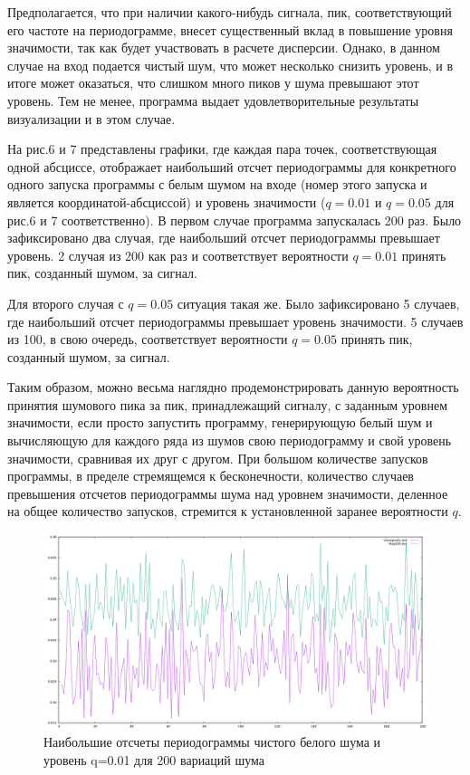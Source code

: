 \documentclass[12pt]{article}
\begin{document}
	 Предполагается, что при наличии какого-нибудь сигнала, пик, соответствующий его частоте на периодограмме, внесет существенный вклад в повышение уровня значимости, так как будет участвовать в расчете дисперсии. Однако, в данном случае на вход подается чистый шум, что может несколько снизить уровень, и в итоге может оказаться, что слишком много пиков у шума превышают этот уровень. Тем не менее, программа выдает удовлетворительные результаты визуализации и в этом случае. 
	 
	 На рис.6 и 7 представлены графики, где каждая пара точек, соответствующая одной абсциссе, отображает наибольший отсчет периодограммы для конкретного одного запуска программы с белым шумом на входе (номер этого запуска и является координатой-абсциссой) и уровень значимости ($q=0.01$ и $q=0.05$ для рис.6 и 7 соответственно). В первом случае программа запускалась 200 раз. Было зафиксировано два случая, где наибольший отсчет периодограммы превышает уровень. 2 случая из 200 как раз и соответствует вероятности $q=0.01$ принять пик, созданный шумом, за сигнал. 
	 
	 Для второго случая с $q=0.05$ ситуация такая же. Было зафиксировано 5 случаев, где наибольший отсчет периодограммы превышает уровень значимости. 5 случаев из 100, в свою очередь, соответствует вероятности $q=0.05$ принять пик, созданный шумом, за сигнал.
	 
	 Таким образом, можно весьма наглядно продемонстрировать данную вероятность принятия шумового пика за пик, принадлежащий сигналу, с заданным уровнем значимости, если просто запустить программу, генерирующую белый шум и вычисляющую для каждого ряда из шумов свою периодограмму и свой уровень значимости, сравнивая их друг с другом. При большом количестве запусков программы, в пределе стремящемся к бесконечности, количество случаев превышения отсчетов периодограммы шума над уровнем значимости, деленное на общее количество запусков, стремится к установленной заранее вероятности $q$.

		\begin{figure}[h]
			\centering
			\includegraphics[width=14cm]{peaksdisp.png} 
			\caption{Наибольшие отсчеты периодограммы чистого белого шума и уровень q=0.01 для 200 вариаций шума} 
			\label{fig.0} 
		\end{figure}		
\end{document}
